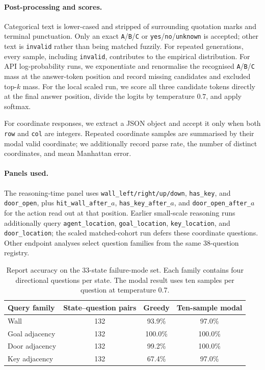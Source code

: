 \documentclass{article}
\begin{document}
\paragraph{Post-processing and scores.}
Categorical text is lower-cased and stripped of surrounding quotation marks and terminal punctuation.
Only an exact \texttt{A}/\texttt{B}/\texttt{C} or \texttt{yes}/\texttt{no}/\texttt{unknown} is accepted; other text is \texttt{invalid} rather than being matched fuzzily.
For repeated generations, every sample, including \texttt{invalid}, contributes to the empirical distribution.
For API log-probability runs, we exponentiate and renormalise the recognised \texttt{A}/\texttt{B}/\texttt{C} mass at the answer-token position and record missing candidates and excluded top-$k$ mass.
For the local scaled run, we score all three candidate tokens directly at the final answer position, divide the logits by temperature $0.7$, and apply softmax.

For coordinate responses, we extract a JSON object and accept it only when both \texttt{row} and \texttt{col} are integers.
Repeated coordinate samples are summarised by their modal valid coordinate; we additionally record parse rate, the number of distinct coordinates, and mean Manhattan error.

\paragraph{Panels used.}
The reasoning-time panel uses \texttt{wall\_left/right/up/down}, \texttt{has\_key}, and \texttt{door\_open}, plus \texttt{hit\_wall\_after\_$a$}, \texttt{has\_key\_after\_$a$}, and \texttt{door\_open\_after\_$a$} for the action read out at that position.
Earlier small-scale reasoning runs additionally query \texttt{agent\_location}, \texttt{goal\_location}, \texttt{key\_location}, and \texttt{door\_location}; the scaled matched-cohort run defers these coordinate questions.
Other endpoint analyses select question families from the same 38-question registry.

\begin{table}[htbp]
\centering
\small
\begin{tabular}{lccc}
\toprule
Query family & State--question pairs & Greedy & Ten-sample modal \tabularnewline
\midrule
Wall & 132 & 93.9\% & 97.0\% \tabularnewline
Goal adjacency & 132 & 100.0\% & 100.0\% \tabularnewline
Door adjacency & 132 & 99.2\% & 100.0\% \tabularnewline
Key adjacency & 132 & 67.4\% & 97.0\% \tabularnewline
\bottomrule
\end{tabular}
\caption{Report accuracy on the 33-state failure-mode set. Each family contains four directional questions per state. The modal result uses ten samples per question at temperature 0.7.}
\label{tab:report-accuracy-33}
\end{table}
\end{document}
